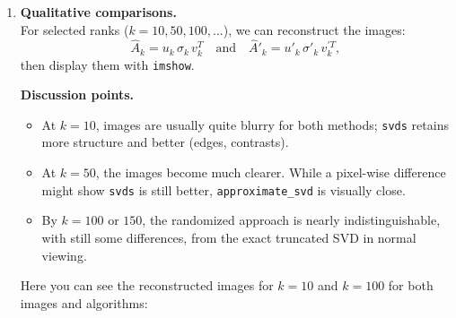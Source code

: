 \documentclass[11pt,a4paper, margin=1in]{article}
\begin{document}
\begin{enumerate}
    \item \textbf{Qualitative comparisons.} \\
    For selected ranks ($k=10, 50, 100, ...$), we can reconstruct
    the images:
    \[
      \hat{A}_{k} = u_{k}\,\sigma_{k}\,v_{k}^{T}
      \quad \text{and} \quad
      \hat{A}'_{k} = u'_{k}\,\sigma'_{k}\,v_{k}^{'T},
    \]
    then display them with \texttt{imshow}. 

    \textbf{Discussion points.}
    \begin{itemize}
      \item At $k=10$, images are usually quite blurry for both methods; 
      \texttt{svds} retains more structure and better (edges, contrasts).
      
      \item At $k=50$, the images become much clearer. While a pixel-wise difference might show 
      \texttt{svds} is still better, \texttt{approximate\_svd} is visually close.
      
      \item By $k=100$ or $150$, the randomized approach is nearly indistinguishable, with still some differences, 
      from the exact truncated SVD in normal viewing.
    \end{itemize}

    Here you can see the reconstructed images for \(k=10\) and \(k=100\) for both images and algorithms:
    

\end{enumerate}
\end{document}
